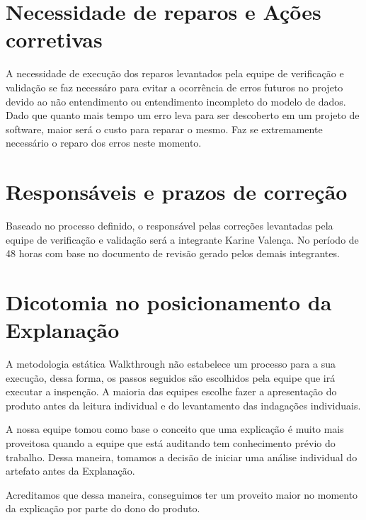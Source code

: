 \section{Necessidade de reparos e Ações corretivas}

A necessidade de execução dos reparos levantados pela equipe de verificação e validação se faz necessáro para evitar
a ocorrência de erros futuros no projeto devido ao não entendimento ou entendimento incompleto do modelo de dados.
Dado que quanto mais tempo um erro leva para ser descoberto em um projeto de software, maior será o custo para reparar o mesmo.
Faz se extremamente necessário o reparo dos erros neste momento.

\section{Responsáveis e prazos de correção}

Baseado no processo definido, o responsável pelas correções levantadas pela equipe de verificação e validação será a integrante Karine
Valença. No período de 48 horas com base no documento de revisão gerado pelos demais integrantes.


\section{Dicotomia no posicionamento da Explanação}

A metodologia estática Walkthrough não estabelece um processo para a sua execução, dessa forma, os passos seguidos são escolhidos pela equipe que irá executar a inspenção. A maioria das equipes escolhe fazer a apresentação do produto antes da leitura individual e do levantamento das indagações individuais.

A nossa equipe tomou como base o conceito que uma explicação é muito mais proveitosa quando a equipe que está auditando tem conhecimento prévio do trabalho.
Dessa maneira, tomamos a decisão de iniciar uma análise individual do artefato
antes da Explanação.

Acreditamos que dessa maneira, conseguimos ter um proveito maior no momento da
explicação por parte do dono do produto.
